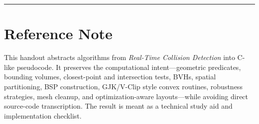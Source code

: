 \documentclass[10pt,letterpaper]{article}
\begin{document}
\medskip\hrule\medskip

\clearpage
{}
\section*{Reference Note}

This handout abstracts algorithms from \emph{Real-Time Collision Detection} into C-like pseudocode. It preserves the computational intent---geometric predicates, bounding volumes, closest-point and intersection tests, BVHs, spatial partitioning, BSP construction, GJK/V-Clip style convex routines, robustness strategies, mesh cleanup, and optimization-aware layouts---while avoiding direct source-code transcription. The result is meant as a technical study aid and implementation checklist.
\end{document}
